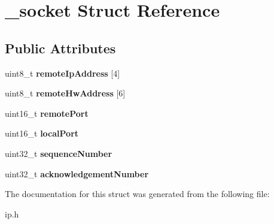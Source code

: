 \hypertarget{struct__socket}{}\section{\+\_\+socket Struct Reference}
\label{struct__socket}
\subsection*{Public Attributes}
\begin{DoxyCompactItemize}
\item 
\mbox{\label{struct__socket_ae438161156389061a3308dd497f2b09f}} 
uint8\+\_\+t {\bfseries remote\+Ip\+Address} \mbox{[}4\mbox{]}
\item 
\mbox{\label{struct__socket_a311f2b383d551ded4600d615c694b017}} 
uint8\+\_\+t {\bfseries remote\+Hw\+Address} \mbox{[}6\mbox{]}
\item 
\mbox{\label{struct__socket_a935bf244e1d1690304b3f458b2027c22}} 
uint16\+\_\+t {\bfseries remote\+Port}
\item 
\mbox{\label{struct__socket_ad983682309ef0025642a48f6aa333524}} 
uint16\+\_\+t {\bfseries local\+Port}
\item 
\mbox{\label{struct__socket_a2f8ccd3dae23cc49d1a81bbcbba14ef5}} 
uint32\+\_\+t {\bfseries sequence\+Number}
\item 
\mbox{\label{struct__socket_a8ccfcadbddb377faf81d9a8e9a72e58f}} 
uint32\+\_\+t {\bfseries acknowledgement\+Number}
\end{DoxyCompactItemize}


The documentation for this struct was generated from the following file\+:\begin{DoxyCompactItemize}
\item 
ip.\+h\end{DoxyCompactItemize}
